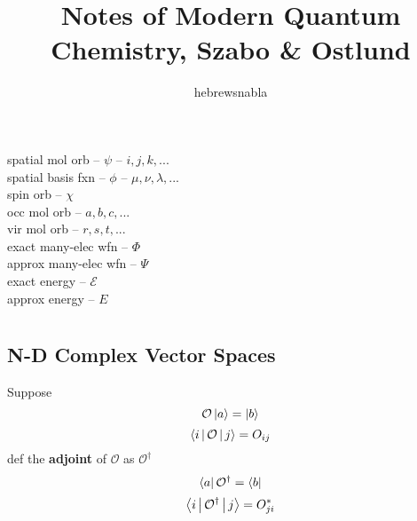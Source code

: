 \documentclass[a4paper]{article}
\title{Notes of \textbf{Modern Quantum Chemistry, Szabo \& Ostlund}}
\author{hebrewsnabla}
\numberwithin{equation}{section}
\begin{document}
\maketitle

\tableofcontents

\newpage

\setcounter{section}{-1}
\section{}
spatial mol orb -- $ \psi $ -- $ i,j,k,... $\\
spatial basis fxn -- $ \phi $ -- $ \mu,\nu,\lambda,... $\\
spin orb -- $ \chi $\\
occ mol orb -- $ a,b,c,... $\\
vir mol orb -- $ r,s,t,... $\\
exact many-elec wfn -- $ \Phi $\\
approx many-elec wfn -- $ \Psi $\\
exact energy -- $ \mathscr{E} $\\
approx energy -- $ E $

\section{}
\subsection{}
\subsection{}
\subsection{}
\subsection{N-D Complex Vector Spaces}
Suppose
\begin{equation}\label{key}
\mathcal{O}\ket{a} = \ket{b}
\end{equation}
\begin{equation}\label{key}
\Braket{i | \mathcal{O} | j} = O_{ij}
\end{equation}
def the \textbf{adjoint} of $ \mathcal{O} $ as $ \mathcal{O}^\dagger $
\begin{equation}\label{key}
\bra{a}\mathcal{O}^\dagger = \bra{b}
\end{equation}
\begin{equation}\label{key}
\Braket{i | \mathcal{O}^\dagger | j} = O_{ji}^*
\end{equation}
\end{document}
